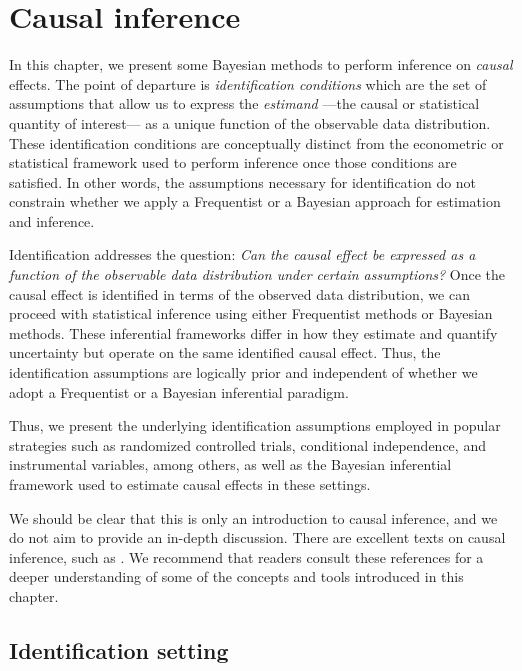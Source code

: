 \chapter{Causal inference}\label{chap12}

In this chapter, we present some Bayesian methods to perform inference on \textit{causal} effects. The point of departure is \textit{identification conditions} which are the set of assumptions that allow us to express the \textit{estimand} —the causal or statistical quantity of interest— as a unique function of the observable data distribution. These identification conditions are conceptually distinct from the econometric or statistical framework used to perform inference once those conditions are satisfied. In other words, the assumptions necessary for identification do not constrain whether we apply a Frequentist or a Bayesian approach for estimation and inference.

Identification addresses the question: \textit{Can the causal effect be expressed as a function of the observable data distribution under certain assumptions?} Once the causal effect is identified in terms of the observed data distribution, we can proceed with statistical inference using either Frequentist methods or Bayesian methods. These inferential frameworks differ in how they estimate and quantify uncertainty but operate on the same identified causal effect. Thus, the identification assumptions are logically prior and independent of whether we adopt a Frequentist or a Bayesian inferential paradigm.

Thus, we present the underlying identification assumptions employed in popular strategies such as randomized controlled trials, conditional independence, and instrumental variables, among others, as well as the Bayesian inferential framework used to estimate causal effects in these settings. 

We should be clear that this is only an introduction to causal inference, and we do not aim to provide an in-depth discussion. There are excellent texts on causal inference, such as \cite{angrist2009mostly,angrist2014mastering,imbens2015causal,hernan2020causal,cunningham2021causal,chernozhukov2024applied}. We recommend that readers consult these references for a deeper understanding of some of the concepts and tools introduced in this chapter.

\section{Identification setting}

